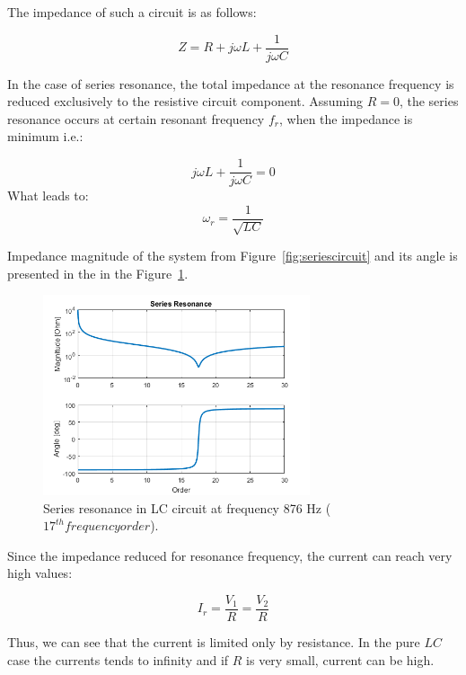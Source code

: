\documentclass[12pt]{report} %
\begin{document}
The impedance of such a circuit is as follows:

\begin{equation}
	Z=R+j\omega L+\dfrac{1}{j\omega C}
\end{equation}

In the case of series resonance, the total impedance at the resonance frequency is reduced exclusively to the resistive circuit component. Assuming $R=0$, the series resonance occurs at certain resonant frequency $f_r$, when the impedance is minimum i.e.:

\begin{equation}
	j\omega L+\dfrac{1}{j\omega C}=0
\end{equation}
What leads to:
\begin{equation}
	\omega_r=\dfrac{1}{\sqrt{LC}}
\end{equation}

Impedance magnitude of the system from Figure~\ref{fig:seriescircuit} and its angle is presented in the in the Figure~\ref{fig:seriesresonance}.

\begin{figure}[htb]
	\centering
    	\includegraphics[width=0.7\textwidth]{img/theory/series_resonance_f876.png}
  	\caption{Series resonance in LC circuit at frequency 876 Hz ($17^{th} frequency order$).}
  	\label{fig:seriesresonance}
\end{figure}
\FloatBarrier

Since the impedance reduced for resonance frequency, the current can reach very high values:

\begin{equation}
	I_r=\dfrac{V_1}{R}=\dfrac{V_2}{R}
\end{equation}

Thus, we can see that the current is limited only by resistance. In the pure $LC$ case the currents tends to infinity and if $R$ is very small, current can be high.
\end{document}
